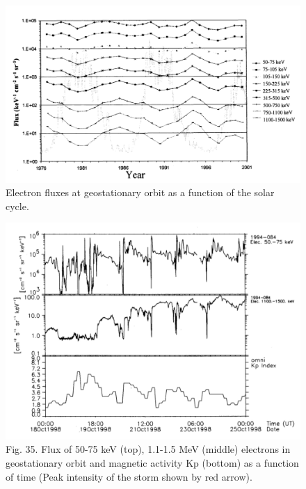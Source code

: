 \documentclass[./dissertation.tex]{subfiles}
\begin{document}
\begin{figure}[h!]
\centering
  \includegraphics[scale = 0.50]{imgs/radbelt6.png}
  \caption{Electron fluxes at geostationary orbit as a function of the solar cycle. \cite{bib2}}
  \label{fig:radbel6}
\end{figure}
\iffalse

\begin{figure}[h!]
\centering
  \includegraphics[scale = 0.50]{imgs/radbelt7.png}
  \caption{
Fig. 35. Flux of 50-75 keV (top), 1.1-1.5 MeV (middle) electrons in geostationary orbit and magnetic activity Kp (bottom) as a function of time (Peak intensity of the storm shown by red arrow). \cite{bib2}}
  \label{fig:radbel7}
\end{figure}
\end{document}
